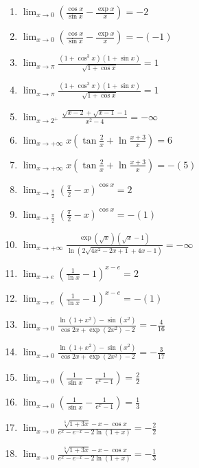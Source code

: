 \documentclass[11pt,a4paper]{article}
\begin{document}
\begin{enumerate}
\item $\displaystyle \lim_{x \to 0} \left(\frac{\cos x}{\sin x} - \frac{\exp x}{x}\right) = -2$
\item $\displaystyle \lim_{x \to 0} \left(\frac{\cos x}{\sin x} - \frac{\exp x}{x}\right) = -\left(-1\right)$
\item $\displaystyle \lim_{x \to \pi} \frac{(1 + \cos^{3} x)(1 + \sin x)}{\sqrt{1 + \cos x}} = 1$
\item $\displaystyle \lim_{x \to \pi} \frac{(1 + \cos^{3} x)(1 + \sin x)}{\sqrt{1 + \cos x}} = 1$
\item $\displaystyle \lim_{x \to 2^{+}} \frac{\sqrt{x - 2} + \sqrt{x - 1} - 1}{x^{2} - 4} = -\infty$
\item $\displaystyle \lim_{x \to +\infty} x\left(\tan\frac{2}{x} + \ln\frac{x + 3}{x}\right) = 6$
\item $\displaystyle \lim_{x \to +\infty} x\left(\tan\frac{2}{x} + \ln\frac{x + 3}{x}\right) = -\left(5\right)$
\item $\displaystyle \lim_{x \to \frac{\pi}{2}} \left(\frac{\pi}{2} - x\right)^{\cos x} = 2$
\item $\displaystyle \lim_{x \to \frac{\pi}{2}} \left(\frac{\pi}{2} - x\right)^{\cos x} = -\left(1\right)$
\item $\displaystyle \lim_{x \to +\infty} \frac{\exp(\sqrt{x})(\sqrt{x} - 1)}{\ln\left(2\sqrt{4x^{2} - 2x + 1} + 4x - 1\right)} = -\infty$
\item $\displaystyle \lim_{x \to e} \left(\frac{1}{\ln x} - 1\right)^{x - e} = 2$
\item $\displaystyle \lim_{x \to e} \left(\frac{1}{\ln x} - 1\right)^{x - e} = -\left(1\right)$
\item $\displaystyle \lim_{x \to 0} \frac{\ln(1 + x^{2}) - \sin(x^{2})}{\cos 2x + \exp(2x^{2}) - 2} = -\frac{4}{16}$
\item $\displaystyle \lim_{x \to 0} \frac{\ln(1 + x^{2}) - \sin(x^{2})}{\cos 2x + \exp(2x^{2}) - 2} = -\frac{3}{17}$
\item $\displaystyle \lim_{x \to 0} \left(\frac{1}{\sin x} - \frac{1}{e^{x} - 1}\right) = \frac{2}{2}$
\item $\displaystyle \lim_{x \to 0} \left(\frac{1}{\sin x} - \frac{1}{e^{x} - 1}\right) = \frac{1}{3}$
\item $\displaystyle \lim_{x \to 0} \frac{\sqrt[3]{1 + 3x} - x - \cos x}{e^{x} - e^{-x} - 2\ln(1 + x)} = -\frac{2}{2}$
\item $\displaystyle \lim_{x \to 0} \frac{\sqrt[3]{1 + 3x} - x - \cos x}{e^{x} - e^{-x} - 2\ln(1 + x)} = -\frac{1}{3}$

\end{enumerate}
\end{document}
